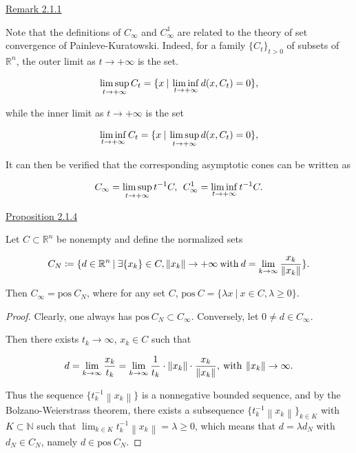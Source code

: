 \documentclass[a4paper,11pt]{jsarticle}
\newcommand{\PROPOSITION}[2]{\begin{itembox}[l]{\underline{Proposition {#1} }}{#2}\end{itembox}}
\newcommand{\REMARK}[2]{\begin{itembox}[l]{\underline{Remark {#1} }}{#2}\end{itembox}}
\newcommand{\NaturalNumberSet}{\mathbb{N}}
\newcommand{\NDemenstionalRealEuclidianSpace}{\mathbb{R}^n}
\begin{document}
\REMARK{2.1.1}{
  Note that the definitions of $C_{\infty}$ and $C_{\infty}^1$ are related to the theory of set convergence of Painleve-Kuratowski. Indeed, for a family $\{C_t\}_{t>0}$ of subsets of $\NDemenstionalRealEuclidianSpace$, the outer limit as $t \rightarrow + \infty$ is the set.

  \begin{equation}
    \limsup_{t \to +\infty} C_t = \{x \:|\: \liminf_{t \to +\infty} d(x, C_t) = 0\}, \notag
  \end{equation}

  while the inner limit as $t \rightarrow +\infty$ is the set

  \begin{equation}
    \liminf_{t \to +\infty} C_t = \{x \:|\: \limsup_{t \to +\infty} d(x, C_t) = 0\}, \notag
  \end{equation}

  It can then be verified that the corresponding asymptotic cones can be written as

  \begin{equation}
    C_{\infty} = \limsup_{t \to +\infty} t^{-1} C,\:\: C_{\infty}^1  = \liminf_{t \to +\infty} t^{-1} C. \notag
  \end{equation}
}

\PROPOSITION{2.1.4}{
  Let $C \subset \NDemenstionalRealEuclidianSpace$ be nonempty and define the normalized sets

  \begin{equation}
    C_N \coloneqq \{d \in \NDemenstionalRealEuclidianSpace \:|\: \exists \{x_k\} \in C, \left\lVert x_k \right\rVert \rightarrow +\infty \:\text{with}\: d = \lim_{k \to \infty} \frac{x_k}{\left\lVert x_k \right\rVert }\}. \notag
  \end{equation}

  Then $C_{\infty} = \text{pos}\:C_N$, where for any set $C$, $\text{pos}\:C = \{\lambda x \:|\: x \in C, \lambda \geq 0\}$.
}

\begin{proof}
  Clearly, one always has $\text{pos}\:C_N \subset C_{\infty}$. Conversely, let $0 \ne d \in C_{\infty}$.

  Then there exists $t_k \rightarrow \infty$, $x_k \in C$ such that

  \begin{equation}
    d = \lim_{k \to \infty} \frac{x_k}{t_k} = \lim_{k \to \infty} \frac{1}{t_k} \cdot \left\lVert x_k \right\rVert \cdot \frac{x_k}{\left\lVert x_k \right\rVert }, \:\text{with}\: \left\lVert x_k \right\rVert \rightarrow \infty. \notag
  \end{equation}

  Thus the sequence $\{t_k^{-1}\left\lVert x_k \right\rVert \}$ is a nonnegative bounded sequence, and by the Bolzano-Weierstrass theorem, there exists a subsequence $\{t_k^{-1}\left\lVert x_k \right\rVert\}_{k \in K}$ with $K \subset \NaturalNumberSet$ such that $\lim_{k \in K} t_k^{-1} \left\lVert x_k \right\rVert = \lambda \geq 0$, which means that $d = \lambda d_N$ with $d_N \in C_N$, namely $d \in \text{pos}\:C_N$.
\end{proof}
\end{document}
